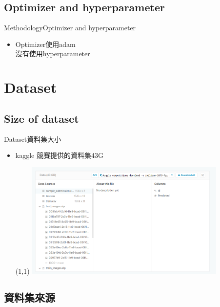 \documentclass{beamer}
\begin{document}
\begin{CJK}{UTF8}{}
\subsection{Optimizer and hyperparameter}

\begin{frame}{Methodology}{Optimizer and hyperparameter}
	\begin{itemize}
	\item{
		Optimizer使用adam\\
		沒有使用hyperparameter
	}
	\end{itemize}
\end{frame}

\section{Dataset}

\subsection{Size of dataset}

\begin{frame}{Dataset}{資料集大小}
\vspace{-4.5cm}
	\begin{itemize}
	\item{
		kaggle 競賽提供的資料集43G
		\begin{textblock}{3}(1,1)
		\includegraphics[width=10cm]{dataset.png}
		\end{textblock}
	}
	\end{itemize}
\end{frame}

\subsection{資料集來源}


\end{CJK}
\end{document}
